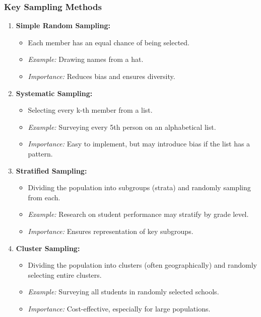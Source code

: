 \documentclass{beamer}
\begin{document}
\begin{frame}[fragile]
    \frametitle{Key Sampling Methods}
    \begin{enumerate}
        \item \textbf{Simple Random Sampling:}
        \begin{itemize}
            \item Each member has an equal chance of being selected.
            \item \textit{Example:} Drawing names from a hat.
            \item \textit{Importance:} Reduces bias and ensures diversity.
        \end{itemize}
        
        \item \textbf{Systematic Sampling:}
        \begin{itemize}
            \item Selecting every k-th member from a list.
            \item \textit{Example:} Surveying every 5th person on an alphabetical list.
            \item \textit{Importance:} Easy to implement, but may introduce bias if the list has a pattern.
        \end{itemize}
        
        \item \textbf{Stratified Sampling:}
        \begin{itemize}
            \item Dividing the population into subgroups (strata) and randomly sampling from each.
            \item \textit{Example:} Research on student performance may stratify by grade level.
            \item \textit{Importance:} Ensures representation of key subgroups.
        \end{itemize}
        
        \item \textbf{Cluster Sampling:}
        \begin{itemize}
            \item Dividing the population into clusters (often geographically) and randomly selecting entire clusters.
            \item \textit{Example:} Surveying all students in randomly selected schools.
            \item \textit{Importance:} Cost-effective, especially for large populations.
        \end{itemize}
    \end{enumerate}
\end{frame}
\end{document}
